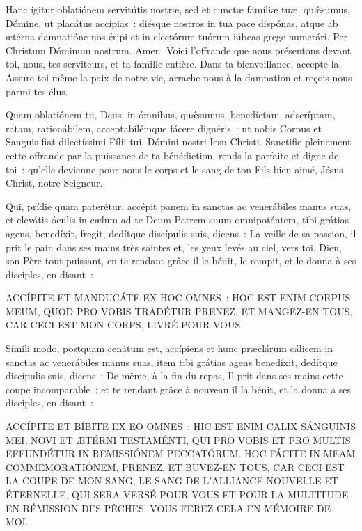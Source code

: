 \begin{paracol}{2}
\LigneParacol
{Hanc ígitur oblatiónem servitútis nostræ, sed et cunctæ famíliæ tuæ, quǽsumus, Dómine, ut placátus accípias~: diésque nostros in tua pace dispónas, atque ab ætérna damnatióne nos éripi et in electórum tuórum iúbeas grege numerári. Per Christum Dóminum nostrum. Amen.}
{Voici l'offrande que nous présentons devant toi, nous, tes serviteurs, et ta famille entière. Dans ta bienveillance, accepte-la. Assure toi-même la paix de notre vie, arrache-nous à la damnation et reçois-nous parmi tes élus.}

\LigneParacol
{Quam oblatiónem tu, Deus, in ómnibus, quǽsumus, benedíctam, adscríptam, ratam, rationábilem, acceptabilémque fácere dignéris~: ut nobis Corpus et Sanguis fiat dilectíssimi Fílii tui, Dómini nostri Iesu Christi.}
{Sanctifie pleinement cette offrande par la puissance de ta bénédiction, rends-la parfaite et digne de toi~: qu'elle devienne pour nous le corps et le sang de ton Fils bien-aimé, Jésus Christ, notre Seigneur.}

\LigneParacol
{Qui, prídie quam paterétur, accépit panem in sanctas ac venerábiles manus suas, et elevátis óculis in cælum ad te Deum Patrem suum omnipoténtem, tibi grátias agens, benedíxit, fregit, dedítque discípulis suis, dicens~:}
{La veille de sa passion, il prit le pain dans ses mains très saintes et, les yeux levés au ciel, vers toi, Dieu, son Père tout-puissant, en te rendant grâce il le bénit, le rompit, et le donna à ses disciples, en disant~:}

\LigneParacol
{ACCÍPITE ET MANDUCÁTE EX HOC OMNES~: HOC EST ENIM CORPUS MEUM, QUOD PRO VOBIS TRADÉTUR}
{PRENEZ, ET MANGEZ-EN TOUS, CAR CECI EST MON CORPS, LIVRÉ POUR VOUS.}

\LigneParacol
{Símili modo, postquam cenátum est, accípiens et hunc præclárum cálicem in sanctas ac venerábiles manus suas, item tibi grátias agens benedíxit, dedítque discípulis suis, dicens~:}
{De même, à la fin du repas, Il prit dans ses mains cette coupe incomparable~; et te rendant grâce à nouveau il la bénit, et la donna a ses disciples, en disant~:}

\LigneParacol
{ACCÍPITE ET BÍBITE EX EO OMNES~: HIC EST ENIM CALIX SÁNGUINIS MEI, NOVI ET ÆTÉRNI TESTAMÉNTI, QUI PRO VOBIS ET PRO MULTIS EFFUNDÉTUR IN REMISSIÓNEM PECCATÓRUM. HOC FÁCITE IN MEAM COMMEMORATIÓNEM.}
{PRENEZ, ET BUVEZ-EN TOUS, CAR CECI EST LA COUPE DE MON SANG, LE SANG DE L'ALLIANCE NOUVELLE ET ÉTERNELLE, QUI SERA VERSÉ POUR VOUS ET POUR LA MULTITUDE EN RÉMISSION DES PÊCHES. VOUS FEREZ CELA EN MÉMOIRE DE MOI.}


\end{paracol}
